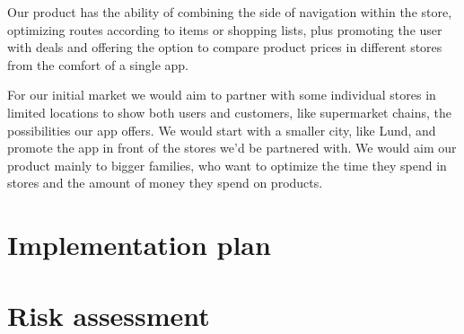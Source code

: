 \documentclass[titlepage]{article}
\begin{document}
Our product has the ability of combining the side of navigation within the store, optimizing routes according to items or shopping lists, plus promoting the user with deals and offering the option to compare product prices in different stores from the comfort of a single app.

For our initial market we would aim to partner with some individual stores in limited locations to show both users and customers, like supermarket chains, the possibilities our app offers. We would start with a smaller city, like Lund, and promote the app in front of the stores we’d be partnered with. We would aim our product mainly to bigger families, who want to optimize the time they spend in stores and the amount of money they spend on products.

\section{Implementation plan}

\section{Risk assessment}
\end{document}
